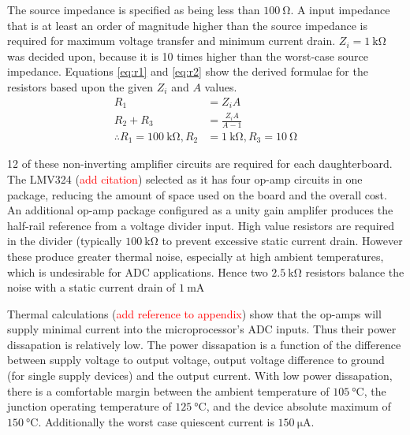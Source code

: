 The source impedance is specified as being less than $\SI{100}{\ohm}$.
A input impedance that is at least an order of magnitude higher than the source impedance is required for maximum voltage transfer and minimum current drain.
$Z_i = \SI{1}{\kilo\ohm}$ was decided upon, because it is 10 times higher than the worst-case source impedance.
Equations \ref{eq:r1} and \ref{eq:r2} show the derived formulae for the resistors based upon the given $Z_i$ and $A$ values.
\begin{align}
	R_1 &= Z_i A \label{eq:r1} \\
	R_2 + R_3 &= \frac{Z_i A}{A - 1} \label{eq:r2} \\[1em]
	\therefore R_1 = \SI{100}{\kilo\ohm}, R_2 &= \SI{1}{\kilo\ohm}, R_3 = \SI{10}{\ohm} \nonumber
\end{align}

12 of these non-inverting amplifier circuits are required for each daughterboard.
The LMV324 (\textcolor{red}{add citation}) selected as it has four op-amp circuits in one package, reducing the amount of space used on the board and the overall cost.
An additional op-amp package configured as a unity gain amplifer produces the half-rail reference from a voltage divider input.
High value resistors are required in the divider (typically $\SI{100}{\kilo\ohm}$ to prevent excessive static current drain.
However these produce greater thermal noise, especially at high ambient temperatures, which is undesirable for ADC applications.
Hence two $\SI{2.5}{\kilo\ohm}$ resistors balance the noise with a static current drain of $\SI{1}{\milli\ampere}$

Thermal calculations (\textcolor{red}{add reference to appendix}) show that the op-amps will supply minimal current into the microprocessor's ADC inputs.
Thus their power dissapation is relatively low.
The power dissapation is a function of the difference between supply voltage to output voltage, output voltage difference to ground (for single supply devices) and the output current.
With low power dissapation, there is a comfortable margin between the ambient temperature of $\SI{105}{\degreeCelsius}$, the junction operating temperature of $\SI{125}{\degreeCelsius}$, and the device absolute maximum of $\SI{150}{\degreeCelsius}$.
Additionally the worst case quiescent current is $\SI{150}{\micro\ampere}$.